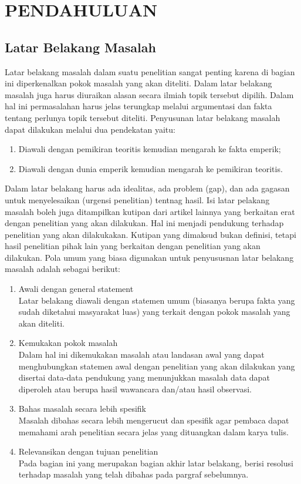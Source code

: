 \chapter{PENDAHULUAN}
\section{Latar Belakang Masalah}
Latar belakang masalah dalam suatu penelitian sangat penting karena di bagian ini diperkenalkan pokok masalah yang akan diteliti. Dalam latar belakang  masalah juga harus diuraikan alasan secara ilmiah topik  tersebut dipilih. Dalam hal ini permasalahan harus jelas terungkap melalui argumentasi dan fakta tentang  perlunya topik tersebut  diteliti. Penyusunan latar belakang masalah  dapat dilakukan melalui dua pendekatan yaitu:
\begin{enumerate}
\item Diawali dengan pemikiran teoritis kemudian mengarah ke fakta emperik;
\item Diawali dengan dunia emperik kemudian mengarah ke pemikiran teoritis.
\end{enumerate}    
Dalam latar belakang harus ada idealitas, ada problem (gap), dan ada gagasan untuk menyelesaikan   (urgensi penelitian) tentnag hasil. Isi latar pelakang masalah boleh juga ditampilkan kutipan dari artikel lainnya yang berkaitan erat dengan penelitian yang akan dilakukan. Hal ini menjadi pendukung terhadap penelitian yang akan dilakukakan. Kutipan yang dimaksud bukan definisi, tetapi hasil penelitian pihak lain yang berkaitan dengan penelitian yang akan dilakukan.
	Pola umum  yang biasa digunakan  untuk penyususnan latar belakang masalah  adalah sebagai berikut:
\begin{enumerate}
\item Awali dengan general statement \\
Latar belakang diawali dengan statemen  umum (biasanya berupa fakta yang sudah diketahui masyarakat luas) yang terkait dengan pokok masalah yang akan diteliti.
\item Kemukakan pokok masalah \\
Dalam hal ini dikemukakan masalah atau landasan awal yang dapat menghubungkan statemen awal dengan penelitian yang akan dilakukan yang disertai data-data pendukung yang menunjukkan masalah data dapat diperoleh atau berupa hasil wawancara dan/atau hasil observasi.
\item Bahas masalah secara lebih spesifik \\
Masalah dibahas secara lebih mengerucut dan spesifik agar pembaca dapat memahami arah penelitian secara jelas yang dituangkan dalam karya tulis. 
\item Relevansikan dengan tujuan penelitian \\
Pada bagian ini yang merupakan bagian akhir latar belakang, berisi resolusi terhadap masalah yang telah dibahas pada pargraf sebelumnya.
\end{enumerate}	

